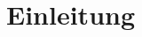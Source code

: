 \documentclass[150]{HSMW-Thesis}
\begin{document}
\begin{Referat}
\end{Referat}

\begin{Vorwort}
\end{Vorwort}

\Hauptteil

\chapter{Einleitung}


\Anhang


\begin{thebibliography}{99}
\bibitem{} 
\end{thebibliography}
\end{document}
